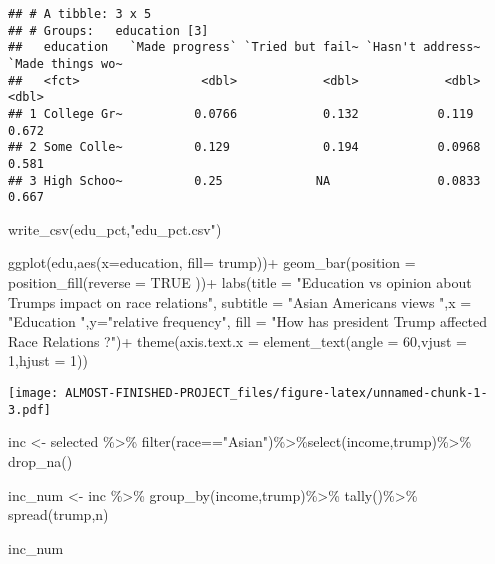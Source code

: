 \documentclass[
]{article}
\newenvironment{Shaded}{\begin{snugshade}}{\end{snugshade}}
\newcommand{\AttributeTok}[1]{\textcolor[rgb]{0.77,0.63,0.00}{#1}}
\newcommand{\ConstantTok}[1]{\textcolor[rgb]{0.00,0.00,0.00}{#1}}
\newcommand{\DecValTok}[1]{\textcolor[rgb]{0.00,0.00,0.81}{#1}}
\newcommand{\FunctionTok}[1]{\textcolor[rgb]{0.00,0.00,0.00}{#1}}
\newcommand{\NormalTok}[1]{#1}
\newcommand{\OtherTok}[1]{\textcolor[rgb]{0.56,0.35,0.01}{#1}}
\newcommand{\SpecialCharTok}[1]{\textcolor[rgb]{0.00,0.00,0.00}{#1}}
\newcommand{\StringTok}[1]{\textcolor[rgb]{0.31,0.60,0.02}{#1}}
\begin{document}
\begin{verbatim}
## # A tibble: 3 x 5
## # Groups:   education [3]
##   education   `Made progress` `Tried but fail~ `Hasn't address~ `Made things wo~
##   <fct>                 <dbl>            <dbl>            <dbl>            <dbl>
## 1 College Gr~          0.0766            0.132           0.119             0.672
## 2 Some Colle~          0.129             0.194           0.0968            0.581
## 3 High Schoo~          0.25             NA               0.0833            0.667
\end{verbatim}

\begin{Shaded}
\begin{Highlighting}[]
\FunctionTok{write\_csv}\NormalTok{(edu\_pct,}\StringTok{"edu\_pct.csv"}\NormalTok{)}

\FunctionTok{ggplot}\NormalTok{(edu,}\FunctionTok{aes}\NormalTok{(}\AttributeTok{x=}\NormalTok{education, }\AttributeTok{fill=}\NormalTok{ trump))}\SpecialCharTok{+}
  \FunctionTok{geom\_bar}\NormalTok{(}\AttributeTok{position =} \FunctionTok{position\_fill}\NormalTok{(}\AttributeTok{reverse =} \ConstantTok{TRUE}\NormalTok{ ))}\SpecialCharTok{+} 
  \FunctionTok{labs}\NormalTok{(}\AttributeTok{title =}  \StringTok{"Education vs opinion about Trump\textquotesingle{}s impact on race relations"}\NormalTok{,}
       \AttributeTok{subtitle =} \StringTok{"Asian Americans views "}\NormalTok{,}\AttributeTok{x =} \StringTok{"Education "}\NormalTok{,}\AttributeTok{y=}\StringTok{"relative frequency"}\NormalTok{, }
       \AttributeTok{fill =} \StringTok{"How has president Trump affected Race Relations ?"}\NormalTok{)}\SpecialCharTok{+}
  \FunctionTok{theme}\NormalTok{(}\AttributeTok{axis.text.x =} \FunctionTok{element\_text}\NormalTok{(}\AttributeTok{angle =} \DecValTok{60}\NormalTok{,}\AttributeTok{vjust =} \DecValTok{1}\NormalTok{,}\AttributeTok{hjust =} \DecValTok{1}\NormalTok{))}
\end{Highlighting}
\end{Shaded}

\texttt{[image: ALMOST-FINISHED-PROJECT\_files/figure-latex/unnamed-chunk-1-3.pdf]}

\begin{Shaded}
\begin{Highlighting}[]
\NormalTok{inc }\OtherTok{\textless{}{-}}\NormalTok{ selected }\SpecialCharTok{\%\textgreater{}\%} \FunctionTok{filter}\NormalTok{(race}\SpecialCharTok{==}\StringTok{"Asian"}\NormalTok{)}\SpecialCharTok{\%\textgreater{}\%}\FunctionTok{select}\NormalTok{(income,trump)}\SpecialCharTok{\%\textgreater{}\%} \FunctionTok{drop\_na}\NormalTok{()}

\NormalTok{inc\_num }\OtherTok{\textless{}{-}}\NormalTok{ inc }\SpecialCharTok{\%\textgreater{}\%}
  \FunctionTok{group\_by}\NormalTok{(income,trump)}\SpecialCharTok{\%\textgreater{}\%}
  \FunctionTok{tally}\NormalTok{()}\SpecialCharTok{\%\textgreater{}\%}
  \FunctionTok{spread}\NormalTok{(trump,n)}

\NormalTok{inc\_num}
\end{Highlighting}
\end{Shaded}
\end{document}
